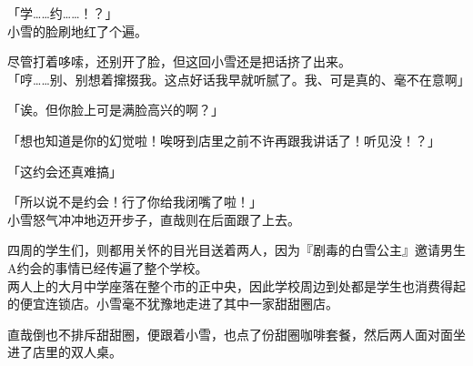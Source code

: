「学……约……！？」\\

小雪的脸刷地红了个遍。

尽管打着哆嗦，还别开了脸，但这回小雪还是把话挤了出来。\\

「哼……别、别想着撺掇我。这点好话我早就听腻了。我、可是真的、毫不在意啊」

「诶。但你脸上可是满脸高兴的啊？」

「想也知道是你的幻觉啦！唉呀到店里之前不许再跟我讲话了！听见没！？」

「这约会还真难搞」

「所以说不是约会！行了你给我闭嘴了啦！」\\

小雪怒气冲冲地迈开步子，直哉则在后面跟了上去。

四周的学生们，则都用关怀的目光目送着两人，因为『剧毒的白雪公主』邀请男生A约会的事情已经传遍了整个学校。\\

两人上的大月中学座落在整个市的正中央，因此学校周边到处都是学生也消费得起的便宜连锁店。小雪毫不犹豫地走进了其中一家甜甜圈店。

直哉倒也不排斥甜甜圈，便跟着小雪，也点了份甜圈咖啡套餐，然后两人面对面坐进了店里的双人桌。\\

